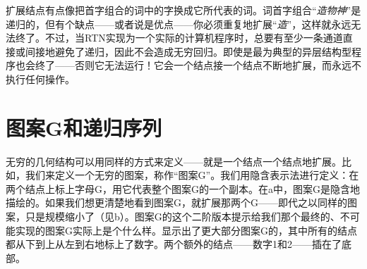 扩展结点有点像把首字组合的词中的字换成它所代表的词。词首字组合“\emph{造物神}”是递归的，但有个缺点——或者说是优点——你必须重复地扩展“\emph{造}”，这样就永远无法终了。不过，当RTN实现为一个实际的计算机程序时，总要有至少一条通道直接或间接地避免了递归，因此不会造成无穷回归。即使是最为典型的异层结构型程序也会终了——否则它无法运行！它会一个结点接一个结点不断地扩展，而永远不执行任何操作。

\section{图案G和递归序列}

无穷的几何结构可以用同样的方式来定义——就是一个结点一个结点地扩展。比如，我们来定义一个无穷的图案，称作“图案G”。我们用隐含表示法进行定义：在两个结点上标上字母G，用它代表整个图案G的一个副本。在a中，图案G是隐含地描绘的。如果我们想更清楚地看到图案G，就扩展那两个G——即代之以同样的图案，只是规模缩小了（见b）。图案G的这个二阶版本提示给我们那个最终的、不可能实现的图案G实际上是个什么样。显示出了更大部分图案G的，其中所有的结点都从下到上从左到右地标上了数字。两个额外的结点——数字1和2——插在了底部。

